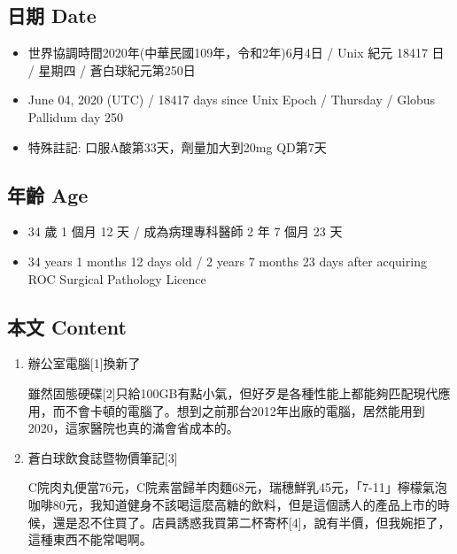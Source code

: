 \documentclass[a5paper, 11pt
]{book}
\providecommand{\tightlist}{%
  \setlength{\itemsep}{0pt}\setlength{\parskip}{0pt}}
\begin{document}
\hypertarget{ux65e5ux671f-date-3}{%
\subsection{日期 Date}\label{ux65e5ux671f-date-3}}

\begin{itemize}
\tightlist
\item
  世界協調時間2020年(中華民國109年，令和2年)6月4日 / Unix 紀元 18417 日
  / 星期四 / 蒼白球紀元第250日
\item
  June 04, 2020 (UTC) / 18417 days since Unix Epoch / Thursday / Globus
  Pallidum day 250
\item
  特殊註記: 口服A酸第33天，劑量加大到20mg QD第7天
\end{itemize}

\hypertarget{ux5e74ux9f61-age-3}{%
\subsection{年齡 Age}\label{ux5e74ux9f61-age-3}}

\begin{itemize}
\tightlist
\item
  34 歲 1 個月 12 天 / 成為病理專科醫師 2 年 7 個月 23 天
\item
  34 years 1 months 12 days old / 2 years 7 months 23 days after
  acquiring ROC Surgical Pathology Licence
\end{itemize}

\hypertarget{ux672cux6587-content-3}{%
\subsection{本文 Content}\label{ux672cux6587-content-3}}

\begin{enumerate}
\def\labelenumi{\arabic{enumi}.}
\item
  辦公室電腦{[}1{]}換新了

  雖然固態硬碟{[}2{]}只給100GB有點小氣，但好歹是各種性能上都能夠匹配現代應用，而不會卡頓的電腦了。想到之前那台2012年出廠的電腦，居然能用到2020，這家醫院也真的滿會省成本的。
\item
  蒼白球飲食誌暨物價筆記{[}3{]}

  C院肉丸便當76元，C院素當歸羊肉麵68元，瑞穗鮮乳45元，「7-11」檸檬氣泡咖啡80元，我知道健身不該喝這麼高糖的飲料，但是這個誘人的產品上市的時候，還是忍不住買了。店員誘惑我買第二杯寄杯{[}4{]}，說有半價，但我婉拒了，這種東西不能常喝啊。
\end{enumerate}
\end{document}
